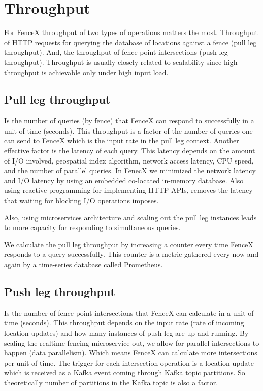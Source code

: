 \documentclass[a4]{report}
\begin{document}
    \section{Throughput}
    For FenceX throughput of two types of operations matters the most.
    Throughput of HTTP requests for querying the database of locations against a fence (pull leg throughput).
    And, the throughput of fence-point intersections (push leg throughput).
    Throughput is usually closely related to scalability since high throughput is achievable only under high input load.

    \subsection{Pull leg throughput}
    Is the number of queries (by fence) that FenceX can respond to successfully in a unit of time (seconds).
    This throughput is a factor of the number of queries one can send to FenceX which is the input rate in the pull leg context.
    Another effective factor is the latency of each query.
    This latency depends on the amount of I/O involved, geospatial index algorithm, network access latency, CPU speed, and the number of parallel queries.
    In FenecX we minimized the network latency and I/O latency by using an embedded co-located in-memory database.
    Also using reactive programming for implementing HTTP APIs, removes the latency that waiting for blocking I/O
    operations imposes.

    Also, using microservices architecture and scaling out the pull leg instances leads to more capacity for responding
    to simultaneous queries.

    We calculate the pull leg throughput by increasing a counter every time FenceX responds to a query successfully.
    This counter is a metric gathered every now and again by a time-series database called Prometheus\cite{prometheus}.

    \subsection{Push leg throughput}
    Is the number of fence-point intersections that FenceX can calculate in a unit of time (seconds).
    This throughput depends on the input rate (rate of incoming location updates) and how many instances of push leg are up and running.
    By scaling the realtime-fencing microservice out, we allow for parallel intersections to happen (data parallelism).
    Which means FenceX can calculate more intersections per unit of time.
    The trigger for each intersection operation is a location update which is received as a Kafka event coming through Kafka topic partitions.
    So theoretically number of partitions in the Kafka topic is also a factor.
\end{document}
